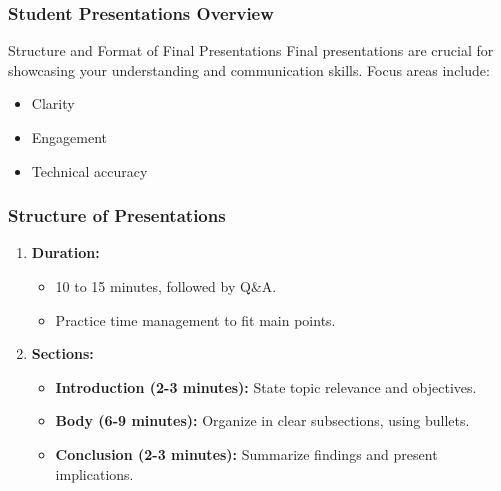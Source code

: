 \documentclass[aspectratio=169]{beamer}
\begin{document}
\begin{frame}[fragile]
    \frametitle{Student Presentations Overview}
    \begin{block}{Structure and Format of Final Presentations}
        Final presentations are crucial for showcasing your understanding and communication skills. Focus areas include:
        \begin{itemize}
            \item Clarity
            \item Engagement
            \item Technical accuracy
        \end{itemize}
    \end{block}
\end{frame}

\begin{frame}[fragile]
    \frametitle{Structure of Presentations}
    \begin{enumerate}
        \item \textbf{Duration:}
            \begin{itemize}
                \item 10 to 15 minutes, followed by Q\&A.
                \item Practice time management to fit main points.
            \end{itemize}
        \item \textbf{Sections:}
            \begin{itemize}
                \item \textbf{Introduction (2-3 minutes):} State topic relevance and objectives.
                \item \textbf{Body (6-9 minutes):} Organize in clear subsections, using bullets.
                \item \textbf{Conclusion (2-3 minutes):} Summarize findings and present implications.
            \end{itemize}
    \end{enumerate}
\end{frame}
\end{document}
